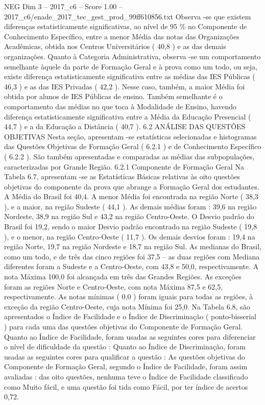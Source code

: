 \begin{textsample}{NEG Dim 3 – 2017\_c6 – Score 1.00 – 2017\_c6/enade\_2017\_tec\_gest\_prod\_99ff610856.txt}
Observa -se que existem diferenças estatisticamente significativas, ao nível de 95 \% no Componente de Conhecimento Específico, entre a menor Média das notas das Organizações Acadêmicas, obtida nos Centros Universitários ( 40,8 ) e as das demais organizações.
Quanto à Categoria Administrativa, observa -se um comportamento semelhante àquele da parte de Formação Geral e à prova como um todo, ou seja, existe diferença estatisticamente significativa entre as médias das IES Públicas ( 46,3 ) e as das IES Privadas ( 42,2 ).
Nesse caso, também, a maior Média foi obtida por alunos de IES Públicas de ensino.
Também semelhante é o comportamento das médias no que toca à Modalidade de Ensino, havendo diferença estatisticamente significativa entre a Média da Educação Presencial ( 44,7 ) e a da Educação a Distância ( 40,7 ). 6.2 ANÁLISE DAS QUESTÕES OBJETIVAS Nesta seção, apresentam -se estatísticas selecionadas e histogramas das Questões Objetivas de Formação Geral ( 6.2.1 ) e de Conhecimento Específico ( 6.2.2 ).
São também apresentadas e comparadas as médias das subpopulações, caracterizadas por Grande Região. 6.2.1 Componente de Formação Geral Na Tabela 6.7, apresentam -se as Estatísticas Básicas relativas às oito questões objetivas do componente da prova que abrange a Formação Geral dos estudantes.
A Média do Brasil foi 40,4.
A menor Média foi encontrada na região Norte ( 38,3 ), e a maior, na região Sudeste ( 44,1 ).
As demais médias foram : 39,6 na região Nordeste, 38,9 na região Sul e 43,2 na região Centro-Oeste.
O Desvio padrão do Brasil foi 19,2, sendo o maior Desvio padrão encontrado na região Sudeste ( 19,8 ), e o menor, na região Centro-Oeste ( 11,7 ).
Os demais desvios foram : 19,4 na região Norte, 19,7 na região Nordeste e 18,7 na região Sul.
As medianas do Brasil, como um todo, e de três das cinco regiões foi 37,5 – as duas regiões com Mediana diferentes foram a Sudeste e a Centro-Oeste, com 43,8 e 50,0, respectivamente.
A nota Máxima 100,0 foi alcançada em três das Grandes Regiões.
As exceções foram as regiões Norte e Centro-Oeste, com nota Máxima 87,5 e 62,5, respectivamente.
As notas mínimas ( 0,0 ) foram iguais para todas as regiões, à exceção da região Centro-Oeste, cuja nota Mínima foi 25,0.
Na Tabela 6.8, são apresentados o Índice de Facilidade e o Índice de Discriminação ( ponto-bisserial ) para cada uma das questões objetivas do Componente de Formação Geral.
Quanto ao Índice de Facilidade, foram usadas as seguintes cores para diferenciar o nível de dificuldade da questão : Quanto ao Índice de Discriminação, foram usadas as seguintes cores para qualificar a questão : As questões objetivas do Componente de Formação Geral, segundo o Índice de Facilidade, foram assim avaliadas : das oito questões, nenhuma teve o Índice de Facilidade classificado como Muito fácil, e uma questão foi tida como Fácil, por ter índice de acertos 0,72.

\end{textsample}
